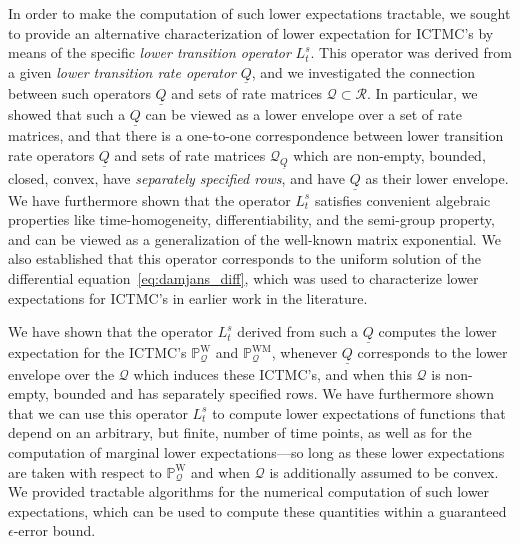 \documentclass[10pt,a4paper]{paper}
\theoremstyle{definition}
\newcommand{\processes}{\mathbb{P}}
\newcommand{\wprocesses}{\processes^{\mathrm{W}}}
\newcommand{\wmprocesses}{\processes^{\mathrm{WM}}}
\newcommand{\rateset}{\mathcal{Q}}
\newcommand{\lrate}{\underline{Q}}
\newcommand{\ictmc}{{ICTMC}}
\begin{document}
In order to make the computation of such lower expectations tractable, we sought to provide an alternative characterization of lower expectation for \ictmc's by means of the specific \emph{lower transition operator} $L_t^s$. This operator was derived from a given \emph{lower transition rate operator} $\lrate$, and we investigated the connection between such operators $\lrate$ and sets of rate matrices $\rateset\subset\mathcal{R}$. In particular, we showed that such a $\lrate$ can be viewed as a lower envelope over a set of rate matrices, and that there is a one-to-one correspondence between lower transition rate operators $\lrate$ and sets of rate matrices $\rateset_{\lrate}$ which are non-empty, bounded, closed, convex, have \emph{separately specified rows}, and have $\lrate$ as their lower envelope. We have furthermore shown that the operator $L_t^s$ satisfies convenient algebraic properties like time-homogeneity, differentiability, and the semi-group property, and can be viewed as a generalization of the well-known matrix exponential. We also established that this operator corresponds to the uniform solution of the differential equation~\eqref{eq:damjans_diff}, which was used to characterize lower expectations for \ictmc's in earlier work in the literature.

We have shown that the operator $L_t^s$ derived from such a $\lrate$ computes the lower expectation for the \ictmc's $\wprocesses_{\rateset}$ and $\wmprocesses_{\rateset}$, whenever $\lrate$ corresponds to the lower envelope over the $\rateset$ which induces these \ictmc's, and when this $\rateset$ is non-empty, bounded and has separately specified rows. We have furthermore shown that we can use this operator $L_t^s$ to compute lower expectations of functions that depend on an arbitrary, but finite, number of time points, as well as for the computation of marginal lower expectations---so long as these lower expectations are taken with respect to $\wprocesses_{\rateset}$ and when $\rateset$ is additionally assumed to be convex. We provided tractable algorithms for the numerical computation of such lower expectations, which can be used to compute these quantities within a guaranteed $\epsilon$-error bound. 
\end{document}
